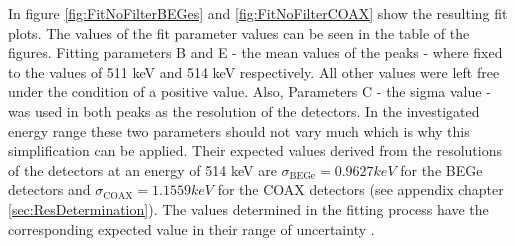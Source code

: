 \documentclass[encoding=utf8,british]{tumphthesis}
\begin{document}
In figure \ref{fig:FitNoFilterBEGes} and \ref{fig:FitNoFilterCOAX} show the resulting fit plots.
The values of the fit parameter values can be seen in the table of the figures.
Fitting parameters B and E - the mean values of the peaks - where fixed to the values of 511 keV and 514 keV respectively.
All other values were left free under the condition of a positive value.
Also, Parameters C - the sigma value - was used in both peaks as the resolution of the detectors.
In the investigated energy range these two parameters should not vary much which is why this simplification can be applied.
Their expected values derived from the resolutions of the detectors at an energy of 514 keV are $\sigma_{\mathrm{BEGe}} = 0.9627 \unit{keV}$ for the BEGe detectors and  $\sigma_{\mathrm{COAX}} = 1.1559 \unit{keV}$ for the COAX detectors (see appendix chapter \ref{sec:ResDetermination}).
The values determined in the fitting process have the corresponding expected value in their range of uncertainty .
\\
\end{document}
